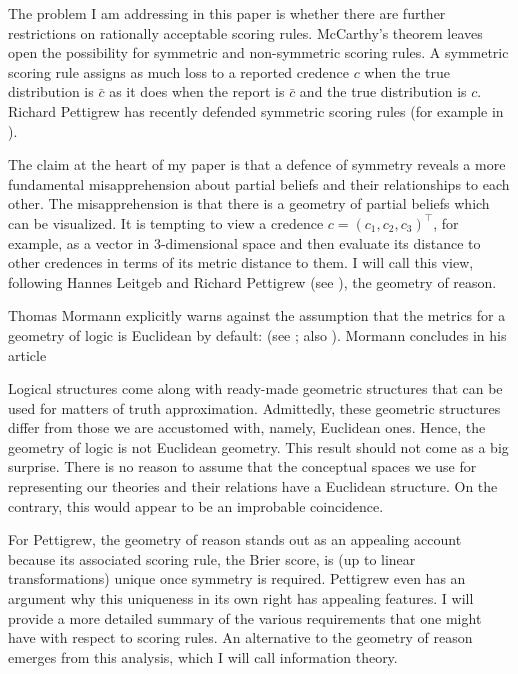 \documentclass[12pt]{article}
\begin{document}
The problem I am addressing in this paper is whether there are further
restrictions on rationally acceptable scoring rules. McCarthy's
theorem leaves open the possibility for symmetric and non-symmetric
scoring rules. A symmetric scoring rule assigns as much loss to a
reported credence $c$ when the true distribution is $\bar{c}$ as it
does when the report is $\bar{c}$ and the true distribution is $c$.
Richard Pettigrew has recently defended symmetric scoring rules (for
example in ).

The claim at the heart of my paper is that a defence of symmetry
reveals a more fundamental misapprehension about partial beliefs and
their relationships to each other. The misapprehension is that there
is a geometry of partial beliefs which can be visualized. It is
tempting to view a credence $c=(c_{1},c_{2},c_{3})^{\intercal}$, for
example, as a vector in 3-dimensional space and then evaluate its
distance to other credences in terms of its metric distance to them. I
will call this view, following Hannes Leitgeb and Richard Pettigrew
(see ), the geometry of reason.

Thomas Mormann explicitly warns against the assumption that the
metrics for a geometry of logic is Euclidean by default:  (see
; also ). Mormann
concludes in his article 

\begin{quotex}
  Logical structures come along with ready-made geometric structures
  that can be used for matters of truth approximation. Admittedly,
  these geometric structures differ from those we are accustomed
  with, namely, Euclidean ones. Hence, the geometry of logic is not
  Euclidean geometry. This result should not come as a big surprise.
  There is no reason to assume that the conceptual spaces we use for
  representing our theories and their relations have a Euclidean
  structure. On the contrary, this would appear to be an improbable
  coincidence. 
\end{quotex}

For Pettigrew, the geometry of reason stands out as an appealing
account because its associated scoring rule, the Brier score, is (up
to linear transformations) unique once symmetry is required. Pettigrew
even has an argument why this uniqueness in its own right has
appealing features. I will provide a more detailed summary of the
various requirements that one might have with respect to scoring
rules. An alternative to the geometry of reason emerges from this
analysis, which I will call information theory.
\end{document}
